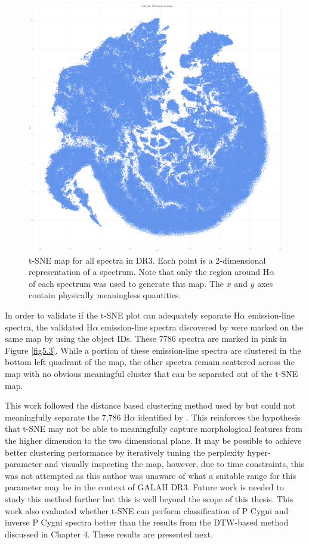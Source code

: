 \begin{figure}[!htb]
\centering
\includegraphics[scale=0.12]{figures/t-sne halpha masked.png}
\caption{t-SNE map for all spectra in DR3. Each point is a 2-dimensional representation of a spectrum. Note that only the region around H$\alpha$ of each spectrum was used to generate this map. The $x$ and $y$ axes contain physically meaningless quantities.}
\label{fig5.2}
\end{figure}

In order to validate if the t-SNE plot can adequately separate H$\alpha$ emission-line spectra, the validated H$\alpha$ emission-line spectra discovered by \citet{vcotar2021galah} were marked on the same map by using the object IDs. These 7786 spectra are marked in pink in Figure \ref{fig5.3}. While a portion of these emission-line spectra are clustered in the bottom left quadrant of the map, the other spectra remain scattered across the map with no obvious meaningful cluster that can be separated out of the t-SNE map. 

This work followed the distance based clustering method used by \citet{traven2017galah} but could not meaningfully separate the 7,786 H$\alpha$ identified by \citet{vcotar2021galah}. This reinforces the hypothesis that t-SNE may not be able to meaningfully capture morphological features from the higher dimension to the two dimensional plane. It may be possible to achieve better clustering performance by iteratively tuning the perplexity hyper-parameter and visually inspecting the map, however, due to time constraints, this was not attempted as this author was unaware of what a suitable range for this parameter may be in the context of GALAH DR3. Future work is needed to study this method further but this is well beyond the scope of this thesis. This work also evaluated whether t-SNE can perform classification of P Cygni and inverse P Cygni spectra better than the results from the DTW-based method discussed in Chapter 4. These results are presented next. 

